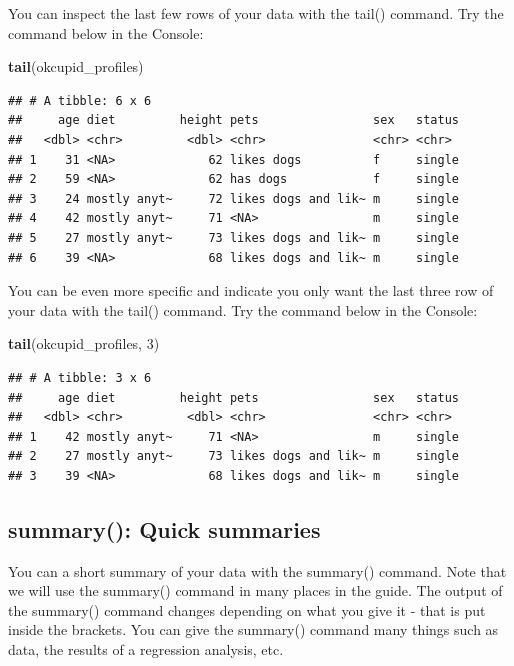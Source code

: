 \documentclass[
]{krantz}
\makeatletter
\newenvironment{Shaded}{\begin{snugshade}}{\end{snugshade}}
\newcommand{\DecValTok}[1]{\textcolor[rgb]{0.06,0.06,0.06}{#1}}
\newcommand{\KeywordTok}[1]{\textcolor[rgb]{0.27,0.27,0.27}{\textbf{#1}}}
\newcommand{\NormalTok}[1]{#1}
\newenvironment{kframe}{%
\medskip{}
\setlength{\fboxsep}{.8em}
 \def\at@end@of@kframe{}%
 \ifinner\ifhmode%
  \def\at@end@of@kframe{\end{minipage}}%
  \begin{minipage}{\columnwidth}%
 \fi\fi%
 \def\FrameCommand##1{\hskip\@totalleftmargin \hskip-\fboxsep
 \colorbox{shadecolor}{##1}\hskip-\fboxsep
     \hskip-\linewidth \hskip-\@totalleftmargin \hskip\columnwidth}%
 \MakeFramed {\advance\hsize-\width
   \@totalleftmargin\z@ \linewidth\hsize
   \@setminipage}}%
 {\par\unskip\endMakeFramed%
 \at@end@of@kframe}
\renewenvironment{Shaded}{\begin{kframe}}{\end{kframe}}
\makeatother
\begin{document}
You can inspect the last few rows of your data with the tail() command. Try the command below in the Console:

\begin{Shaded}
\begin{Highlighting}[]
\KeywordTok{tail}\NormalTok{(okcupid_profiles)}
\end{Highlighting}
\end{Shaded}

\begin{verbatim}
## # A tibble: 6 x 6
##     age diet         height pets                sex   status
##   <dbl> <chr>         <dbl> <chr>               <chr> <chr> 
## 1    31 <NA>             62 likes dogs          f     single
## 2    59 <NA>             62 has dogs            f     single
## 3    24 mostly anyt~     72 likes dogs and lik~ m     single
## 4    42 mostly anyt~     71 <NA>                m     single
## 5    27 mostly anyt~     73 likes dogs and lik~ m     single
## 6    39 <NA>             68 likes dogs and lik~ m     single
\end{verbatim}

You can be even more specific and indicate you only want the last three row of your data with the tail() command. Try the command below in the Console:

\begin{Shaded}
\begin{Highlighting}[]
\KeywordTok{tail}\NormalTok{(okcupid_profiles, }\DecValTok{3}\NormalTok{)}
\end{Highlighting}
\end{Shaded}

\begin{verbatim}
## # A tibble: 3 x 6
##     age diet         height pets                sex   status
##   <dbl> <chr>         <dbl> <chr>               <chr> <chr> 
## 1    42 mostly anyt~     71 <NA>                m     single
## 2    27 mostly anyt~     73 likes dogs and lik~ m     single
## 3    39 <NA>             68 likes dogs and lik~ m     single
\end{verbatim}

\hypertarget{summary-quick-summaries}{%
\subsection{summary(): Quick summaries}\label{summary-quick-summaries}}

You can a short summary of your data with the summary() command. Note that we will use the summary() command in many places in the guide. The output of the summary() command changes depending on what you give it - that is put inside the brackets. You can give the summary() command many things such as data, the results of a regression analysis, etc.
\end{document}
